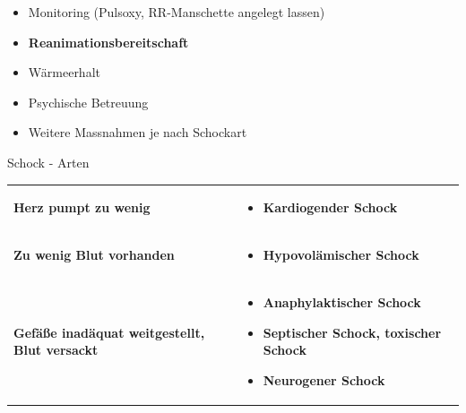 \documentclass{article}
\newcommand\gEs[1]{\textbf{\textcolor[rgb]{0.0,0.0,0.5019608}{#1}}}
\newcommand\gEs[1]{\textbf{\textcolor[rgb]{0.0,0.0,0.5019608}{#1}}}
\begin{document}
\begin{itemize}
\item {\mdseries\color[rgb]{0.0,0.0,0.5019608}
Monitoring (Pulsoxy, RR-Manschette angelegt lassen)}

\item {\mdseries\color[rgb]{0.0,0.0,0.5019608}
\textbf{Reanimationsbereitschaft} }

\item {\mdseries\color[rgb]{0.0,0.0,0.5019608}
W\"armeerhalt}

\item {\mdseries\color[rgb]{0.0,0.0,0.5019608}
Psychische Betreuung}

\item {\color[rgb]{0.0,0.0,0.5019608}
Weitere Massnahmen je nach Schockart }

\end{itemize}
{\mdseries\color[rgb]{0.0,0.0,0.5019608}
Schock - Arten}

\begin{center}
\begin{tabular}{|m{4.8430004cm}|m{8.457cm}|}
\hline
\centering {\bfseries\upshape\color[rgb]{0.0,0.0,0.5019608}
Mechanismus}\par

 &
\centering {\bfseries\upshape\color[rgb]{0.0,0.0,0.5019608}
Schockart}\par

\\\hline
{\bfseries Herz pumpt zu wenig}

 &
\begin{itemize}
\item {\mdseries \gEs{Kardiogender Schock}}

\end{itemize}
\\\hline
{\bfseries Zu wenig Blut vorhanden }

 &
\begin{itemize}
\item {\mdseries \gEs{Hypovol\"amischer Schock}}

\end{itemize}
\\\hline
{\bfseries Gef\"a{\ss}e inad\"aquat weitgestellt, Blut versackt}

 &
\begin{itemize}
\item {\mdseries \gEs{Anaphylaktischer Schock}}

\item {\mdseries \gEs{Septischer Schock, toxischer
Schock}}

\item {\mdseries \gEs{Neurogener Schock}}

\end{itemize}
\\\hline
\end{tabular}
\end{center}
\end{document}
